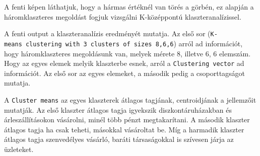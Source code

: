 \documentclass[
  letterpaper,
]{krantz}
\makeatletter
\newenvironment{Shaded}{\begin{snugshade}}{\end{snugshade}}
\newcommand{\CommentTok}[1]{\textcolor[rgb]{0.37,0.37,0.37}{#1}}
\newcommand{\DecValTok}[1]{\textcolor[rgb]{0.68,0.00,0.00}{#1}}
\newcommand{\FunctionTok}[1]{\textcolor[rgb]{0.28,0.35,0.67}{#1}}
\newcommand{\NormalTok}[1]{\textcolor[rgb]{0.00,0.23,0.31}{#1}}
\newcommand{\OtherTok}[1]{\textcolor[rgb]{0.00,0.23,0.31}{#1}}
\newcommand{\SpecialCharTok}[1]{\textcolor[rgb]{0.37,0.37,0.37}{#1}}
\newenvironment{kframe}{%
\medskip{}
\setlength{\fboxsep}{.8em}
 \def\at@end@of@kframe{}%
 \ifinner\ifhmode%
  \def\at@end@of@kframe{\end{minipage}}%
  \begin{minipage}{\columnwidth}%
 \fi\fi%
 \def\FrameCommand##1{\hskip\@totalleftmargin \hskip-\fboxsep
 \colorbox{shadecolor}{##1}\hskip-\fboxsep
     \hskip-\linewidth \hskip-\@totalleftmargin \hskip\columnwidth}%
 \MakeFramed {\advance\hsize-\width
   \@totalleftmargin\z@ \linewidth\hsize
   \@setminipage}}%
 {\par\unskip\endMakeFramed%
 \at@end@of@kframe}
\renewenvironment{Shaded}{\begin{kframe}}{\end{kframe}}
\makeatother
\begin{document}
A fenti képen láthatjuk, hogy a hármas értéknél van törés a görbén, ez
alapján a háromklaszteres megoldást fogjuk vizsgálni K-középpontú
klaszteranalízissel.

\begin{Shaded}
\end{Shaded}

A fenti output a klaszteranalízis eredményét mutatja. Az első sor
(\texttt{K-means\ clustering\ with\ 3\ clusters\ of\ sizes\ 8,6,6})
arról ad információt, hogy háromklaszteres megoldásunk van, melyek
mérete 8, illetve 6, 6 elemszám. Hogy az egyes elemek melyik klaszterbe
esnek, arról a \texttt{Clustering\ vector} ad információt. Az első sor
az egyes elemeket, a második pedig a csoporttagságot mutatja.

A \texttt{Cluster\ means} az egyes klaszterek átlagos tagjának,
centroidjának a jellemzőit mutatják. Az első klaszter átlagos tagja
igyekszik diszkontáruházakban és árleszállításokon vásárolni, minél több
pénzt megtakarítani. A második klaszter átlagos tagja ha csak teheti,
másokkal vásároltat be. Míg a harmadik klaszter átlagos tagja
szenvedélyes vásárló, baráti társaságokkal is szívesen járja az
üzleteket.
\end{document}
